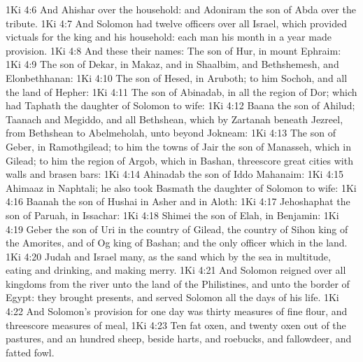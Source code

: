 \vs 1Ki 4:6 And Ahishar  over the household: and Adoniram the son of Abda  over the tribute.
\vs 1Ki 4:7 And Solomon had twelve officers over all Israel, which provided victuals for the king and his household: each man his month in a year made provision.
\vs 1Ki 4:8 And these  their names: The son of Hur, in mount Ephraim:
\vs 1Ki 4:9 The son of Dekar, in Makaz, and in Shaalbim, and Bethshemesh, and Elonbethhanan:
\vs 1Ki 4:10 The son of Hesed, in Aruboth; to him  Sochoh, and all the land of Hepher:
\vs 1Ki 4:11 The son of Abinadab, in all the region of Dor; which had Taphath the daughter of Solomon to wife:
\vs 1Ki 4:12 Baana the son of Ahilud;  Taanach and Megiddo, and all Bethshean, which  by Zartanah beneath Jezreel, from Bethshean to Abelmeholah,  unto  beyond Jokneam:
\vs 1Ki 4:13 The son of Geber, in Ramothgilead; to him  the towns of Jair the son of Manasseh, which  in Gilead; to him  the region of Argob, which  in Bashan, threescore great cities with walls and brasen bars:
\vs 1Ki 4:14 Ahinadab the son of Iddo  Mahanaim:
\vs 1Ki 4:15 Ahimaaz  in Naphtali; he also took Basmath the daughter of Solomon to wife:
\vs 1Ki 4:16 Baanah the son of Hushai  in Asher and in Aloth:
\vs 1Ki 4:17 Jehoshaphat the son of Paruah, in Issachar:
\vs 1Ki 4:18 Shimei the son of Elah, in Benjamin:
\vs 1Ki 4:19 Geber the son of Uri  in the country of Gilead,  the country of Sihon king of the Amorites, and of Og king of Bashan; and  the only officer which  in the land.
\vs 1Ki 4:20 Judah and Israel  many, as the sand which  by the sea in multitude, eating and drinking, and making merry.
\vs 1Ki 4:21 And Solomon reigned over all kingdoms from the river unto the land of the Philistines, and unto the border of Egypt: they brought presents, and served Solomon all the days of his life.
\vs 1Ki 4:22 And Solomon's provision for one day was thirty measures of fine flour, and threescore measures of meal,
\vs 1Ki 4:23 Ten fat oxen, and twenty oxen out of the pastures, and an hundred sheep, beside harts, and roebucks, and fallowdeer, and fatted fowl.
